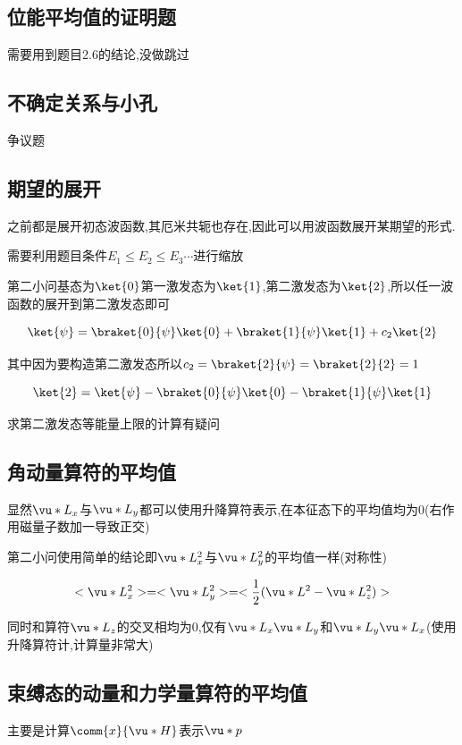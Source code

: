         \subsection{位能平均值的证明题}
            需要用到题目2.6的结论,没做跳过

        \subsection{不确定关系与小孔}
            争议题
        \subsection{期望的展开}
            之前都是展开初态波函数,其厄米共轭也存在,因此可以用波函数展开某期望的形式.

            需要利用题目条件$ E_{1} \leq E_{2} \leq E_{3} \cdots $进行缩放

            第二小问基态为$\ket{0}$第一激发态为$\ket{1}$,第二激发态为$\ket{2}$,所以任一波函数的展开到第二激发态即可

            $$ \ket{\psi} = \braket{0}{\psi} \ket{0} + \braket{1}{\psi} \ket{1} + c_{2} \ket{2} $$

            其中因为要构造第二激发态所以$c_{2} = \braket{2}{\psi} = \braket{2}{2} = 1$

            $$   \ket{2} = \ket{\psi} - \braket{0}{\psi} \ket{0} - \braket{1}{\psi} \ket{1} $$
            
            求第二激发态等能量上限的计算有疑问
        
        \subsection{角动量算符的平均值}
            显然$\vu*{L}_{x}$与$\vu*{L}_{y}$都可以使用升降算符表示,在本征态下的平均值均为0(右作用磁量子数加一导致正交)

            第二小问使用简单的结论即$\vu*{L}_{x}^{2}$与$\vu*{L}_{y}^{2}$的平均值一样(对称性)

            $$ <\vu*{L}_{x}^{2}>  = <\vu*{L}_{y}^{2}> = < \frac{1}{2} (\vu*{L}^{2} - \vu*{L}_{z}^{2}) > $$

            同时和算符$\vu*{L}_{z}$的交叉相均为0,仅有$\vu*{L}_{x} \vu*{L}_{y}$和$\vu*{L}_{y} \vu*{L}_{x}$(使用升降算符计,计算量非常大)

        \subsection{束缚态的动量和力学量算符的平均值}
            主要是计算$\comm{x}{\vu*{H}}$表示$\vu*{p}$

